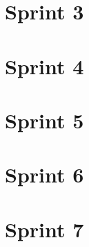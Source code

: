 	
	\section{Sprint 3}
	
	\section{Sprint 4}
	
	\section{Sprint 5}
	
	\section{Sprint 6}
	
	\section{Sprint 7}
	